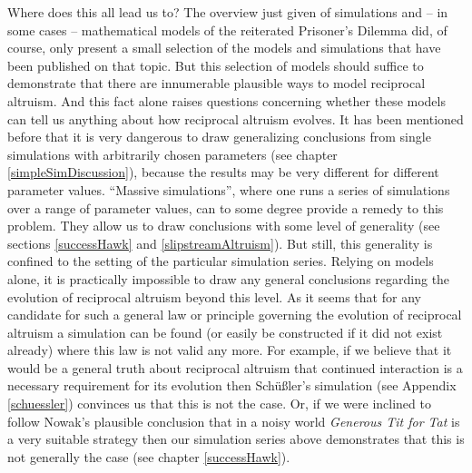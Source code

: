 Where does this all lead us to? The overview just given of simulations and --
in some cases -- mathematical models of the reiterated Prisoner's Dilemma did,
of course, only present a small selection of the models and simulations that
have been published on that topic. But this selection of models should suffice
to demonstrate that there are innumerable plausible ways to model reciprocal
altruism. And this fact alone raises questions concerning whether these models
can tell us anything about how reciprocal altruism evolves. It has been
mentioned before that it is very dangerous to draw generalizing conclusions
from single simulations with arbitrarily chosen parameters (see chapter
\ref{simpleSimDiscussion}), because the results may be very different for
different parameter values. ``Massive simulations'', where one runs a series
of simulations over a range of parameter values, can to some degree provide a
remedy to this problem. They allow us to draw conclusions with some level of
generality (see sections \ref{successHawk} and \ref{slipstreamAltruism}). But
still, this generality is confined to the setting of the particular simulation
series. Relying on models alone, it is practically impossible to draw any
general conclusions regarding the evolution of reciprocal altruism beyond this
level. As it seems that for any candidate for such a general law or
principle governing the evolution of reciprocal altruism a simulation can be
found (or easily be constructed if it did not exist already) where this law
is not valid any more. For example, if we believe that it would be a general
truth about reciprocal altruism that continued interaction is a necessary
requirement for its evolution then Schüßler's simulation (see Appendix
\ref{schuessler}) convinces us that this is not the case. Or, if we were
inclined to follow Nowak's plausible conclusion \cite[]{nowak:1990} that in a
noisy world {\em Generous Tit for Tat} is a very suitable strategy then our
simulation series above demonstrates that this is not generally the case (see
chapter \ref{successHawk}).

